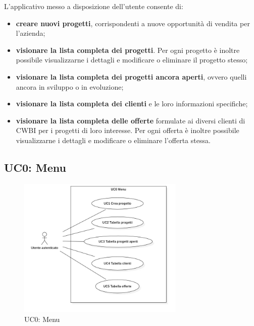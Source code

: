 \noindent L'applicativo messo a disposizione dell'utente consente di:
\begin{itemize}
\item \textbf{creare nuovi progetti}, corrispondenti a nuove opportunità di vendita per l'azienda;
\item \textbf{visionare la lista completa dei progetti}. Per ogni progetto è inoltre possibile visualizzarne i dettagli e modificare o eliminare il progetto stesso;
\item \textbf{visionare la lista completa dei progetti ancora aperti}, ovvero quelli ancora in sviluppo o in evoluzione;
\item \textbf{visionare la lista completa dei clienti} e le loro informazioni specifiche;
\item \textbf{visionare la lista completa delle offerte} formulate ai diversi clienti di CWBI per i progetti di loro interesse. Per ogni offerta è inoltre possibile visualizzarne i dettagli e modificare o eliminare l'offerta stessa.
\end{itemize}  

\subsection{UC0: Menu}
\begin{figure}[!h]
\centering
\includegraphics[width=300px]{../images/UC/.jpeg/UC0-menu.jpg}
\caption{UC0: Menu}
\label{fig:UC0}
\end{figure}

